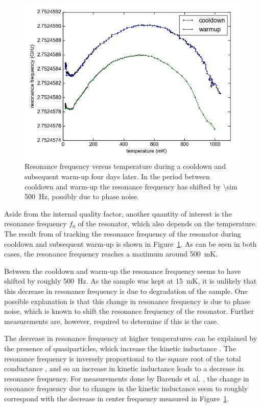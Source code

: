 \begin{figure}[h!]
    \centering
    \includegraphics[width=.72\textwidth]{Figures/DRIE/Temperature tracking - f0 vs T.png}
    \caption{Resonance frequency versus temperature during a cooldown and subsequent warm-up four days later. In the period between cooldown and warm-up the resonance frequency has shifted by \SI{\sim 500}{\hertz}, possibly due to phase noise.}
    \label{fig:temperature_tracking_f0}
\end{figure}


Aside from the internal quality factor, another quantity of interest is the resonance frequency $f_0$ of the resonator, which also depends on the temperature. The result from of tracking the resonance frequency of the resonator during cooldown and subsequent warm-up is shown in Figure~\ref{fig:temperature_tracking_f0}. As can be seen in both cases, the resonance frequency reaches a maximum around \SI{500}{\milli \kelvin}.

Between the cooldown and warm-up the resonance frequency seems to have shifted by roughly \SI{500}{Hz}. As the sample was kept at \SI{15}{\milli \kelvin}, it is unlikely that this decrease in resonance frequency is due to degradation of the sample. One possible explanation is that this change in resonance frequency is due to phase noise, which is known to shift the resonance frequency of the resonator. Further measurements are, however, required to determine if this is the case.

The decrease in resonance frequency at higher temperatures can be explained by the presence of quasiparticles, which increase the kinetic inductance \cite[p91]{Geerlings}. The resonance frequency is inversely proportional to the square root of the total conductance \cite{barends2008contribution}, and so an increase in kinetic inductance leads to a decrease in resonance frequency. For measurements done by Barends et al. \cite{barends2008contribution}, the change in resonance frequency due to changes in the kinetic inductance seem to roughly correspond with the decrease in center frequency measured in Figure~\ref{fig:temperature_tracking_f0}.


